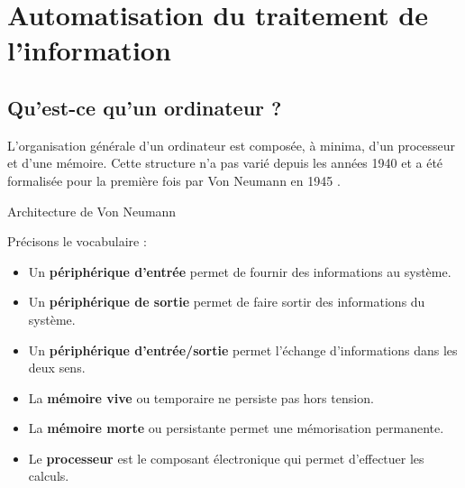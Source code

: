 \documentclass[a4paper,10pt]{report}
\newcommand\rubrique{rubrique}
\theoremstyle{exo}
\theoremstyle{exercice}
\begin{document}
\renewcommand\rubrique{L'intelligence artificielle}
\chapter{Automatisation du traitement de l'information}

\section{Qu'est-ce qu'un ordinateur ?}

L'organisation générale d'un ordinateur est composée, à minima, d'un processeur et d'une mémoire. Cette structure n'a pas varié depuis les années 1940 et a été formalisée pour la première fois par Von Neumann en 1945 .

\begin{center}

Architecture de Von Neumann\end{center}

Précisons le vocabulaire :

\begin{itemize}
    \item Un {\bfseries périphérique d'entrée} permet de fournir des informations au système. 
    \item Un {\bfseries périphérique de sortie} permet de faire sortir des informations du système.
    \item Un {\bfseries périphérique d'entrée/sortie} permet l'échange d'informations dans les deux sens.
    \item La {\bfseries mémoire vive} ou temporaire ne persiste pas hors tension.
    \item La {\bfseries mémoire morte} ou persistante permet une mémorisation permanente.
    \item Le {\bfseries processeur} est le composant électronique qui permet d'effectuer les calculs.
\end{itemize}
\end{document}
